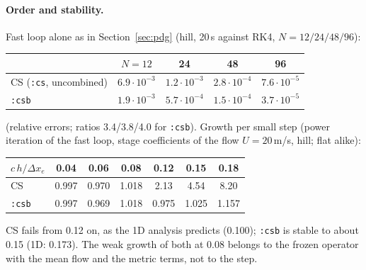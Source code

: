 \documentclass[11pt,a4paper]{article}
\newcommand{\code}[1]{\texttt{#1}}
\begin{document}
\paragraph{Order and stability.} Fast loop alone as in Section~\ref{sec:pdg} (hill, 20\,s against RK4, $N=12/24/48/96$):
\begin{center}\small
\begin{tabular}{lcccc}\toprule
 & $N=12$ & 24 & 48 & 96\\\midrule
CS (\code{:cs}, uncombined) & $6.9\cdot10^{-3}$ & $1.2\cdot10^{-3}$ & $2.8\cdot10^{-4}$ & $7.6\cdot10^{-5}$\\
\code{:csb} & $1.9\cdot10^{-3}$ & $5.7\cdot10^{-4}$ & $1.5\cdot10^{-4}$ & $3.7\cdot10^{-5}$\\\bottomrule
\end{tabular}
\end{center}
(relative errors; ratios 3.4/3.8/4.0 for \code{:csb}). Growth per small step (power iteration of the fast loop, stage coefficients of the
flow $U=20$\,m/s, hill; flat alike):
\begin{center}\small
\begin{tabular}{lcccccc}\toprule
$c\,h/\Delta x_e$ & 0.04 & 0.06 & 0.08 & 0.12 & 0.15 & 0.18\\\midrule
CS & 0.997 & 0.970 & 1.018 & 2.13 & 4.54 & 8.20\\
\code{:csb} & 0.997 & 0.969 & 1.018 & 0.975 & 1.025 & 1.157\\\bottomrule
\end{tabular}
\end{center}
CS fails from 0.12 on, as the 1D analysis predicts (0.100); \code{:csb} is stable to about 0.15 (1D: 0.173). The weak growth of
both at 0.08 belongs to the frozen operator with the mean flow and the metric terms, not to the step.
\end{document}
